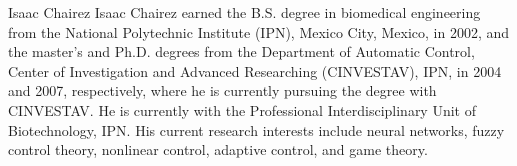 \documentclass[journal,twocolumn]{IEEEtran}
\begin{document}
\begin{IEEEbiographynophoto}{Isaac Chairez}
Isaac Chairez earned the B.S. degree in biomedical engineering from the National Polytechnic Institute (IPN), Mexico City, Mexico, in 2002, and the master’s and Ph.D. degrees from the Department of Automatic Control, Center of Investigation and Advanced Researching (CINVESTAV), IPN, in 2004 and 2007, respectively, where he is currently pursuing the degree with CINVESTAV. He is currently with the Professional Interdisciplinary Unit of Biotechnology, IPN. His current research interests include neural networks, fuzzy control theory, nonlinear control, adaptive control, and game theory.
\end{IEEEbiographynophoto}






\end{document}
